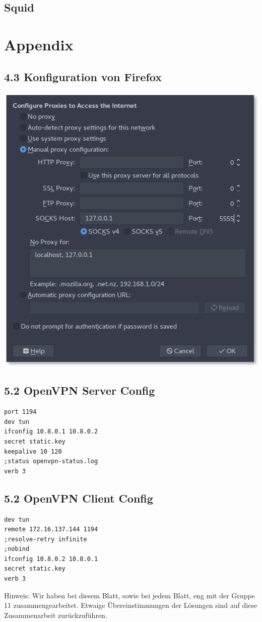 \documentclass[10pt,a4paper]{article}
\begin{document}
\subsection{Squid}



\newpage
\section*{Appendix}
\subsection*{4.3 Konfiguration von Firefox}
\includegraphics[width=\textwidth]{images/image.png}

\subsection*{5.2 OpenVPN Server Config}
\begin{verbatim}
port 1194
dev tun
ifconfig 10.8.0.1 10.8.0.2
secret static.key
keepalive 10 120
;status openvpn-status.log
verb 3
\end{verbatim}
\subsection*{5.2 OpenVPN Client Config}
\begin{verbatim}
dev tun
remote 172.16.137.144 1194
;resolve-retry infinite
;nobind
ifconfig 10.8.0.2 10.8.0.1
secret static.key
verb 3
\end{verbatim}

Hinweis: Wir haben bei diesem Blatt, sowie bei jedem Blatt, eng mit der Gruppe 11 zusammengearbeitet. Etwaige Übereinstimmungen der Lösungen sind auf diese Zusammenarbeit zurückzuführen.
\end{document}
